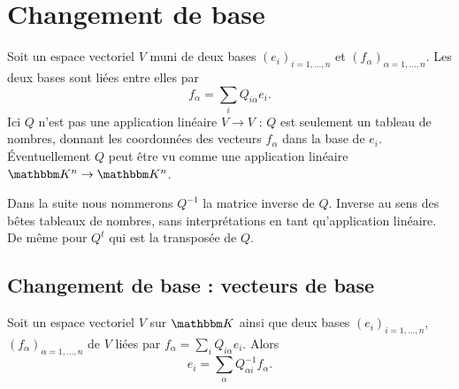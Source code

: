
\section{Changement de base}

Soit un espace vectoriel \( V\) muni de deux bases \( (e_i)_{i=1,\ldots, n}\) et \( (f_{\alpha})_{\alpha=1,\ldots, n}\). Les deux bases sont liées entre elles par
\begin{equation}        \label{EQooFRQRooSMsQQB}
    f_{\alpha}=\sum_iQ_{i\alpha}e_i.
\end{equation}
Ici \( Q\) n'est pas une application linéaire \( V\to V\) : \( Q\) est seulement un tableau de nombres, donnant les coordonnées des vecteurs \( f_{\alpha}\) dans la base de \( e_i\). Éventuellement \( Q\) peut être vu comme une application linéaire \( \eK^n\to \eK^n\).

Dans la suite nous nommerons \( Q^{-1}\) la matrice inverse de \( Q\). Inverse au sens des bêtes tableaux de nombres, sans interprétations en tant qu'application linéaire. De même pour \( Q^t\) qui est la transposée de \( Q\).

\subsection{Changement de base : vecteurs de base}

\begin{lemma}       \label{LEMooIHZGooOZoYZd}
    Soit un espace vectoriel \( V\) sur \( \eK\) ainsi que deux bases \( (e_i)_{i=1,\ldots, n}\), \( (f_{\alpha})_{\alpha=1,\ldots, n}\) de \( V\) liées par \( f_{\alpha}=\sum_iQ_{i\alpha}e_i\). Alors
    \begin{equation}    \label{EQooZQPAooAbKAdg}
        e_i=\sum_{\alpha}Q^{-1}_{\alpha i}f_{\alpha}.
    \end{equation}
\end{lemma}

